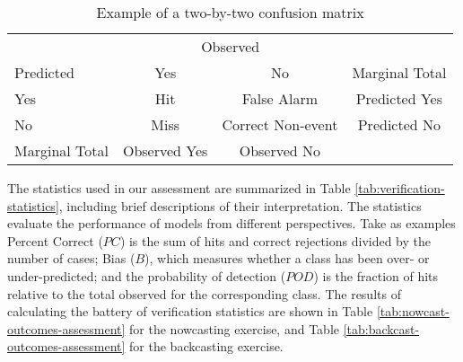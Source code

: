 \documentclass[]{elsarticle} %
\begin{document}
\begin{table}[!h]

\caption{\label{tab:example-confusion-matrix}\label{tab:confusion-matrix}Example of a two-by-two confusion matrix}
\centering
\fontsize{7}{9}\selectfont
\begin{tabular}[t]{lccc}
\toprule
\multicolumn{1}{c}{ } & \multicolumn{2}{c}{Observed} & \multicolumn{1}{c}{ } \\
\cmidrule(l{3pt}r{3pt}){2-3}
Predicted & Yes & No & Marginal Total\\
\midrule
\rowcolor{gray!6}  Yes & Hit & False Alarm & Predicted Yes\\
No & Miss & Correct Non-event & Predicted No\\
\rowcolor{gray!6}  Marginal Total & Observed Yes & Observed No & \\
\bottomrule
\end{tabular}
\end{table}

The statistics used in our assessment are summarized in Table
\ref{tab:verification-statistics}, including brief descriptions of their
interpretation. The statistics evaluate the performance of models from
different perspectives. Take as examples Percent Correct (\(PC\)) is the
sum of hits and correct rejections divided by the number of cases; Bias
(\(B\)), which measures whether a class has been over- or
under-predicted; and the probability of detection (\(POD\)) is the
fraction of hits relative to the total observed for the corresponding
class. The results of calculating the battery of verification statistics
are shown in Table \ref{tab:nowcast-outcomes-assessment} for the
nowcasting exercise, and Table \ref{tab:backcast-outcomes-assessment}
for the backcasting exercise.
\end{document}
